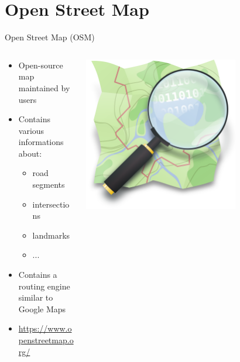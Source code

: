 \documentclass[aspectratio=169]{beamer}
\begin{document}
\section{Open Street Map}
\begin{frame}{Open Street Map (OSM) \cite{haklay2008openstreetmap}}

\begin{columns}
\begin{column}{0.5\textwidth}
	
	\begin{itemize}
		\item Open-source map maintained by users
		\item Contains various informations about:
		\begin{itemize}
			\item road segments
			\item intersections
			\item landmarks
			\item ...
		\end{itemize}
		\item Contains a routing engine similar to Google Maps 
		\item \url{https://www.openstreetmap.org/}
	\end{itemize}
\end{column}
\begin{column}{0.5\textwidth}  %
    \begin{center}
     \includegraphics[width=0.7\textwidth]{figures/osm_logo.png}
     \end{center}
\end{column}
\end{columns}
\end{frame}
\end{document}
